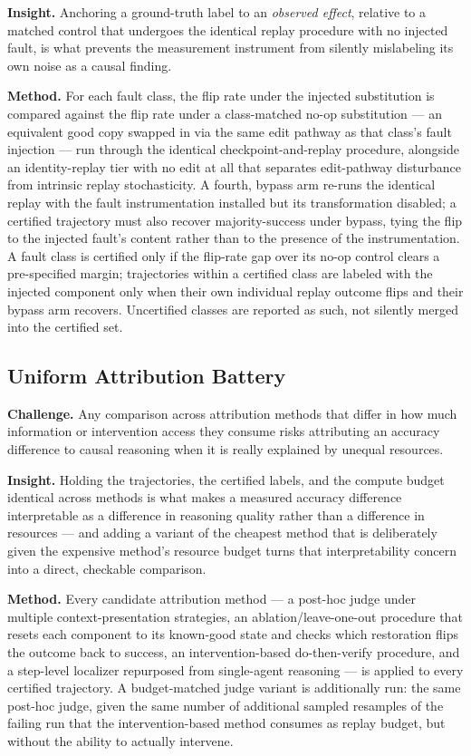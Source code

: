 \documentclass[11pt]{article}
\begin{document}
\textbf{Insight.} Anchoring a ground-truth label to an \emph{observed effect}, relative to a matched control that undergoes the identical replay procedure with no injected fault, is what prevents the measurement instrument from silently mislabeling its own noise as a causal finding.

\textbf{Method.} For each fault class, the flip rate under the injected substitution is compared against the flip rate under a class-matched no-op substitution --- an equivalent good copy swapped in via the same edit pathway as that class's fault injection --- run through the identical checkpoint-and-replay procedure, alongside an identity-replay tier with no edit at all that separates edit-pathway disturbance from intrinsic replay stochasticity. A fourth, bypass arm re-runs the identical replay with the fault instrumentation installed but its transformation disabled; a certified trajectory must also recover majority-success under bypass, tying the flip to the injected fault's content rather than to the presence of the instrumentation. A fault class is certified only if the flip-rate gap over its no-op control clears a pre-specified margin; trajectories within a certified class are labeled with the injected component only when their own individual replay outcome flips and their bypass arm recovers. Uncertified classes are reported as such, not silently merged into the certified set.

\subsection{Uniform Attribution Battery}
\textbf{Challenge.} Any comparison across attribution methods that differ in how much information or intervention access they consume risks attributing an accuracy difference to causal reasoning when it is really explained by unequal resources.

\textbf{Insight.} Holding the trajectories, the certified labels, and the compute budget identical across methods is what makes a measured accuracy difference interpretable as a difference in reasoning quality rather than a difference in resources --- and adding a variant of the cheapest method that is deliberately given the expensive method's resource budget turns that interpretability concern into a direct, checkable comparison.

\textbf{Method.} Every candidate attribution method --- a post-hoc judge under multiple context-presentation strategies, an ablation/leave-one-out procedure that resets each component to its known-good state and checks which restoration flips the outcome back to success, an intervention-based do-then-verify procedure, and a step-level localizer repurposed from single-agent reasoning --- is applied to every certified trajectory. A budget-matched judge variant is additionally run: the same post-hoc judge, given the same number of additional sampled resamples of the failing run that the intervention-based method consumes as replay budget, but without the ability to actually intervene.
\end{document}
